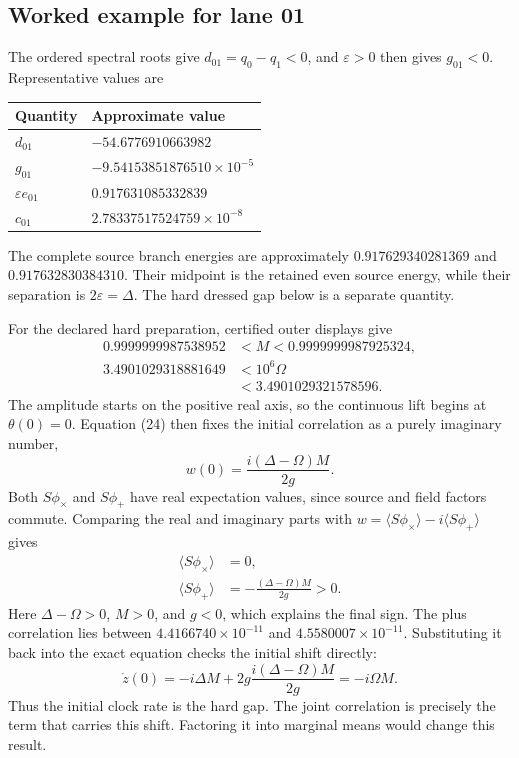 \documentclass[10pt,twocolumn,letterpaper]{article}
\begin{document}
\subsection{Worked example for lane 01}
The ordered spectral roots give $d_{01}=q_0-q_1<0$, and $\varepsilon>0$ then gives $g_{01}<0$. Representative values are
\begin{center}
\small
\begin{tabular*}{\columnwidth}{@{\extracolsep{\fill}}ll@{}}
\toprule
Quantity & Approximate value \\
\midrule
$d_{01}$ & $-54.6776910663982$ \\
$g_{01}$ & $-9.54153851876510\times10^{-5}$ \\
$\varepsilon e_{01}$ & $0.917631085332839$ \\
$c_{01}$ & $2.78337517524759\times10^{-8}$ \\
\bottomrule
\end{tabular*}
\end{center}
The complete source branch energies are approximately $0.917629340281369$ and $0.917632830384310$. Their midpoint is the retained even source energy, while their separation is $2\varepsilon=\Delta$. The hard dressed gap below is a separate quantity.

For the declared hard preparation, certified outer displays give
\begin{equation}
\begin{aligned}
0.9999999987538952&<M<0.9999999987925324,\\
3.4901029318881649&<10^6\Omega\\
&<3.4901029321578596.
\end{aligned}\tag{32}\label{eq:clock-lane01-inputs}
\end{equation}
The amplitude starts on the positive real axis, so the continuous lift begins at $\theta(0)=0$. Equation (24) then fixes the initial correlation as a purely imaginary number,
\[
w(0)=\frac{i(\Delta-\Omega)M}{2g}.
\]
Both $S\phi_\times$ and $S\phi_+$ have real expectation values, since source and field factors commute. Comparing the real and imaginary parts with $w=\langle S\phi_\times\rangle-i\langle S\phi_+\rangle$ gives
\begin{equation}
\begin{aligned}
\langle S\phi_\times\rangle&=0,\\
\langle S\phi_+\rangle&=-\frac{(\Delta-\Omega)M}{2g}>0.
\end{aligned}\tag{33}\label{eq:clock-lane01-correlations}
\end{equation}
Here $\Delta-\Omega>0$, $M>0$, and $g<0$, which explains the final sign. The plus correlation lies between $4.4166740\times10^{-11}$ and $4.5580007\times10^{-11}$. Substituting it back into the exact equation checks the initial shift directly:
\[
\dot z(0)
=-i\Delta M+2g\frac{i(\Delta-\Omega)M}{2g}
=-i\Omega M.
\]
Thus the initial clock rate is the hard gap. The joint correlation is precisely the term that carries this shift. Factoring it into marginal means would change this result.
\end{document}
